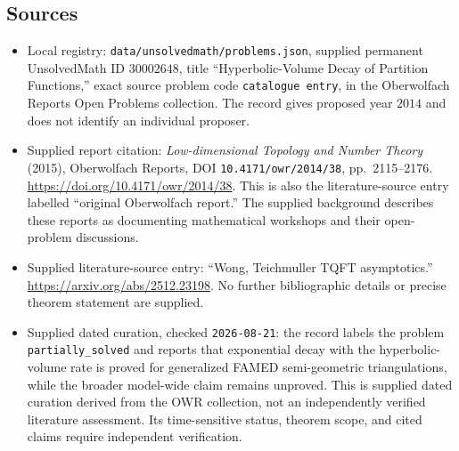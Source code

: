 \documentclass[11pt]{article}
\begin{document}
\subsection{Sources}
\begin{itemize}
\item Local registry: \texttt{data/unsolvedmath/problems.json}, supplied permanent UnsolvedMath ID \(30002648\), title ``Hyperbolic-Volume Decay of Partition Functions,'' exact source problem code \texttt{catalogue entry}, in the Oberwolfach Reports Open Problems collection. The record gives proposed year \(2014\) and does not identify an individual proposer.
\item Supplied report citation: \emph{Low-dimensional Topology and Number Theory} (2015), Oberwolfach Reports, DOI \texttt{10.4171/owr/2014/38}, pp.\ 2115--2176. \url{https://doi.org/10.4171/owr/2014/38}. This is also the literature-source entry labelled ``original Oberwolfach report.'' The supplied background describes these reports as documenting mathematical workshops and their open-problem discussions.
\item Supplied literature-source entry: ``Wong, Teichmuller TQFT asymptotics.'' \url{https://arxiv.org/abs/2512.23198}. No further bibliographic details or precise theorem statement are supplied.
\item Supplied dated curation, checked \texttt{2026-08-21}: the record labels the problem \texttt{partially\_solved} and reports that exponential decay with the hyperbolic-volume rate is proved for generalized FAMED semi-geometric triangulations, while the broader model-wide claim remains unproved. This is supplied dated curation derived from the OWR collection, not an independently verified literature assessment. Its time-sensitive status, theorem scope, and cited claims require independent verification.
\end{itemize}
\end{document}

